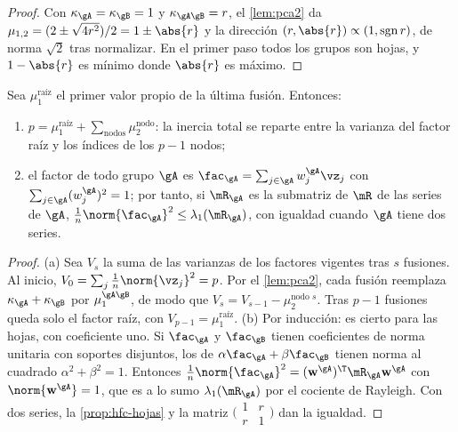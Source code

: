 \begin{proof}
Con $\kappa_{\gA}=\kappa_{\gB}=1$ y $\kappa_{\gA\gB}=r$, el \cref{lem:pca2} da
$\mu_{1,2}=(2\pm\sqrt{4r^2})/2=1\pm\abs{r}$ y la dirección $(r,\abs{r})\propto(1,\operatorname{sgn}
r)$, de norma $\sqrt2$ tras normalizar. En el primer paso todos los grupos son hojas, y
$1-\abs{r}$ es mínimo donde $\abs{r}$ es máximo.
\end{proof}

\begin{proposicion}\label{prop:hfc-inercia}
Sea $\mu_1^{\text{raíz}}$ el primer valor propio de la última fusión. Entonces:
\begin{enumerate}[label=(\alph*)]
  \item $p=\mu_1^{\text{raíz}}+\sum_{\text{nodos}}\mu_2^{\text{nodo}}$: la inercia total se
    reparte entre la varianza del factor raíz y los índices de los $p-1$ nodos;
  \item el factor de todo grupo $\gA$ es $\fac_{\gA}=\sum_{j\in\gA}w^{\gA}_j\vz_j$ con
    $\sum_{j\in\gA}(w^{\gA}_j)^2=1$; por tanto, si $\mR_{\gA}$ es la submatriz de $\mR$ de
    las series de $\gA$, $\frac1n\norm{\fac_{\gA}}^2\le\lambda_1(\mR_{\gA})$, con igualdad cuando
    $\gA$ tiene dos series.
\end{enumerate}
\end{proposicion}

\begin{proof}
(a) Sea $V_s$ la suma de las varianzas de los factores vigentes tras $s$ fusiones. Al inicio,
$V_0=\sum_j\frac1n\norm{\vz_j}^2=p$. Por el \cref{lem:pca2}, cada fusión reemplaza
$\kappa_{\gA}+\kappa_{\gB}$ por $\mu_1^{\gA\gB}$, de modo que $V_{s}=V_{s-1}-\mu_2^{\text{nodo }s}$.
Tras $p-1$ fusiones queda solo el factor raíz, con $V_{p-1}=\mu_1^{\text{raíz}}$.
(b) Por inducción: es cierto para las hojas, con coeficiente uno. Si $\fac_{\gA}$ y $\fac_{\gB}$
tienen coeficientes de norma unitaria con soportes disjuntos, los de
$\alpha\fac_{\gA}+\beta\fac_{\gB}$ tienen norma al cuadrado $\alpha^2+\beta^2=1$. Entonces
$\frac1n\norm{\fac_{\gA}}^2=(\mathbf{w}^{\gA})^{\T}\mR_{\gA}\mathbf{w}^{\gA}$ con
$\norm{\mathbf{w}^{\gA}}=1$, que es a lo sumo $\lambda_1(\mR_{\gA})$ por el cociente de Rayleigh.
Con dos series, la \cref{prop:hfc-hojas} y la matriz $\bigl(\begin{smallmatrix}1&r\\r&1
\end{smallmatrix}\bigr)$ dan la igualdad.
\end{proof}

